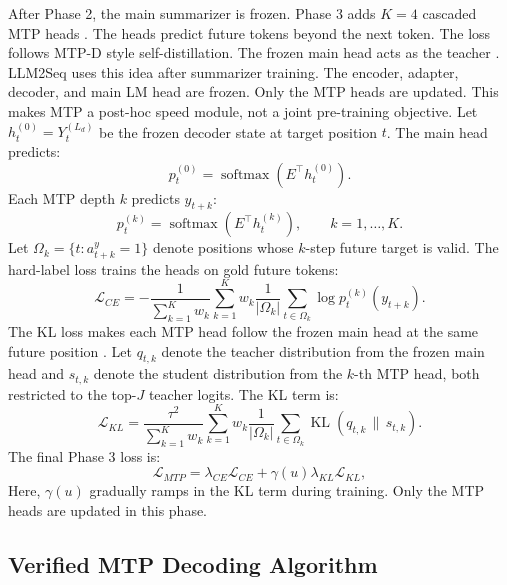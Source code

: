 \documentclass[11pt]{article}
\begin{document}
After Phase 2, the main summarizer is frozen.
Phase 3 adds $K=4$ cascaded MTP heads \citep{gloeckle2024mtp,zhao2026mtpdistill,deepseekai2024deepseekv3}.
The heads predict future tokens beyond the next token.
The loss follows MTP-D style self-distillation.
The frozen main head acts as the teacher \citep{zhao2026mtpdistill,deepseekai2024deepseekv3}.
LLM2Seq uses this idea after summarizer training.
The encoder, adapter, decoder, and main LM head are frozen.
Only the MTP heads are updated.
This makes MTP a post-hoc speed module, not a joint pre-training objective.
Let $h_t^{(0)}=Y^{(L_d)}_t$ be the frozen decoder state at target position $t$.
The main head predicts:
\begin{equation}
p_t^{(0)}=\operatorname{softmax}(E^\top h_t^{(0)}).
\end{equation}
Each MTP depth $k$ predicts $y_{t+k}$:
\begin{equation}
p_t^{(k)}=\operatorname{softmax}(E^\top h_t^{(k)}),
\qquad k=1,\ldots,K.
\end{equation}
Let $\Omega_k=\{t:a^y_{t+k}=1\}$ denote positions whose $k$-step future target is valid.
The hard-label loss trains the heads on gold future tokens:
\begin{equation}
\mathcal{L}_{CE}
=-\frac{1}{\sum_{k=1}^{K}w_k}
\sum_{k=1}^{K}w_k
\frac{1}{|\Omega_k|}
\sum_{t\in\Omega_k}\log p_t^{(k)}(y_{t+k}).
\end{equation}
The KL loss makes each MTP head follow the frozen main head at the same future position \citep{hinton2015distilling}.
Let $q_{t,k}$ denote the teacher distribution from the frozen main head and $s_{t,k}$ denote the student distribution from the $k$-th MTP head, both restricted to the top-$J$ teacher logits.
The KL term is:
\begin{equation}
\mathcal{L}_{KL}
=\frac{\tau^2}{\sum_{k=1}^{K}w_k}
\sum_{k=1}^{K}w_k
\frac{1}{|\Omega_k|}
\sum_{t\in\Omega_k}\operatorname{KL}(q_{t,k}\,\|\,s_{t,k}).
\end{equation}
The final Phase 3 loss is:
\begin{equation}
\mathcal{L}_{MTP}
=\lambda_{CE}\mathcal{L}_{CE}
+\gamma(u)\lambda_{KL}\mathcal{L}_{KL},
\end{equation}
Here, $\gamma(u)$ gradually ramps in the KL term during training.
Only the MTP heads are updated in this phase.

\subsection{Verified MTP Decoding Algorithm}
\end{document}
